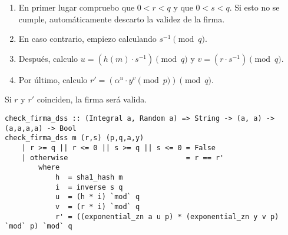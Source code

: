 \documentclass[10pt,spanish]{article}
\begin{document}
\begin{enumerate}
    \item En primer lugar compruebo que $0 < r < q$ y que $0 < s < q$. Si esto no se cumple, automáticamente descarto la validez de la firma.
    \item En caso contrario, empiezo calculando $s^{-1} \pmod q$.
    \item Después, calculo $u = (h(m) \cdot s^{-1}) \pmod q$ y $v = (r \cdot s^{-1}) \pmod q$.
    \item Por último, calculo $r' = (\alpha^u \cdot y^v \pmod p) \pmod q$.
\end{enumerate}

Si $r$ y $r'$ coinciden, la firma será valida.

\begin{verbatim}
check_firma_dss :: (Integral a, Random a) => String -> (a, a) -> (a,a,a,a) -> Bool
check_firma_dss m (r,s) (p,q,a,y)
    | r >= q || r <= 0 || s >= q || s <= 0 = False
    | otherwise                            = r == r'
        where
            h  = sha1_hash m
            i  = inverse s q
            u  = (h * i) `mod` q
            v  = (r * i) `mod` q
            r' = ((exponential_zn a u p) * (exponential_zn y v p) `mod` p) `mod` q 
\end{verbatim}
\end{document}
